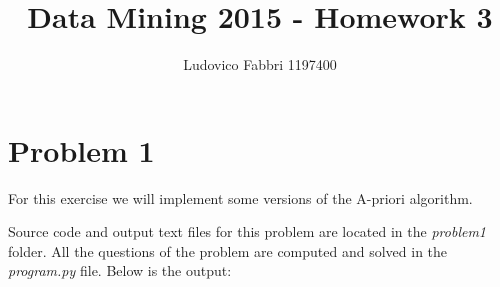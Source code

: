 \documentclass{article}
\begin{document}
\raggedright

\doublespacing


\title{ {\Huge{Data Mining 2015 - Homework 3}} }
\author {Ludovico Fabbri 1197400}
\maketitle


\section{Problem 1}
For this exercise we will implement some versions of the A-priori algorithm.

Source code and output text files for this problem are located in the \textit{problem1} folder. All the questions of the problem are computed and solved in the \textit{program.py} file.
Below is the output:
\end{document}
